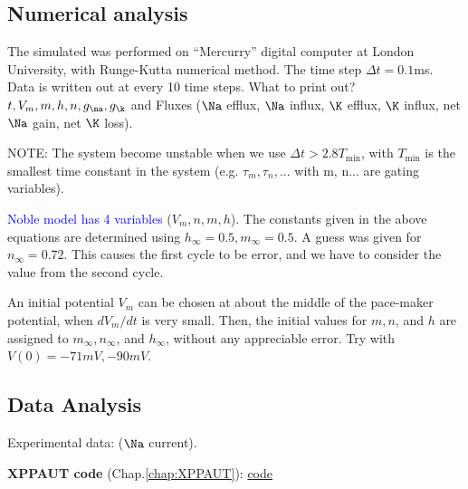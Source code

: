 \subsection{Numerical analysis}
\label{sec:numerical-analysis-4}

The simulated was performed on ``Mercurry'' digital computer at London
University, with Runge-Kutta numerical method. The time step $\Delta
t=0.1$ms. Data is written out at every 10 time steps. What to print out?
$t, V_m, m,h,n,g_\na, g_\k$ and Fluxes ($\Na$ efflux, $\Na$ influx, $\K$
efflux, $\K$ influx, net $\Na$ gain, net $\K$ loss).

NOTE: The system become unstable when we use $\Delta t > 2.8 T_\min$,
with $T_\min$ is the smallest time constant in the system
(e.g. $\tau_m, \tau_n,...$ with m, n... are gating variables). 

\textcolor{blue}{Noble model has 4 variables} ($V_m, n, m, h$).  The
constants given in the above equations are determined using
$h_\infty=0.5, m_\infty=0.5$. A guess was given for
$n_\infty=0.72$. This causes the first cycle to be error, and we have
to consider the value from the second cycle.

An initial potential $V_m$ can be chosen at about the middle of the pace-maker
potential, when $dV_m/dt$ is very small. Then, the initial values for $m, n$,
and $h$ are assigned to $m_\infty, n_\infty$, and $h_\infty$, without any
appreciable error. Try with $V(0)=-71mV, -90mV$.


\subsection{Data Analysis}
\label{sec:analysis-5}

Experimental data: \citep{weidmann1955cmp} ($\Na$ current).

{\bf XPPAUT code} (Chap.\ref{chap:XPPAUT}): \hyperref[Noble_model]{code}


